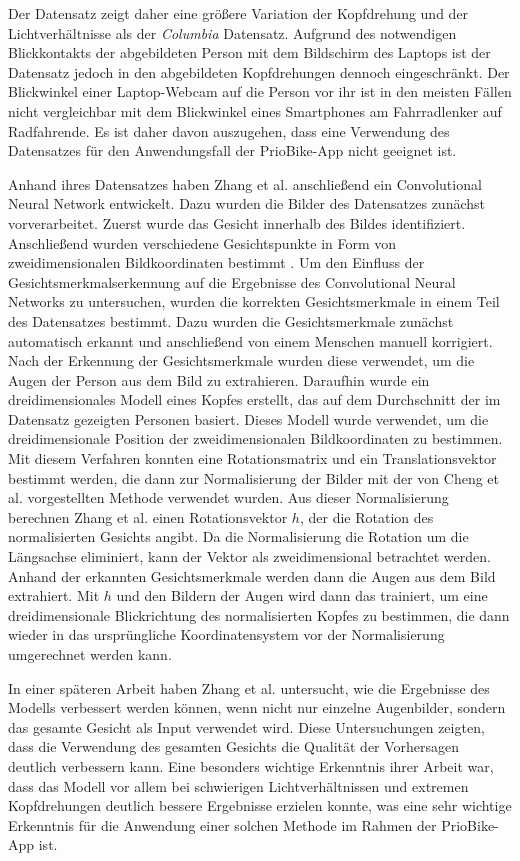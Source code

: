 Der Datensatz zeigt daher eine größere Variation der Kopfdrehung und der Lichtverhältnisse als der \textit{Columbia} \cite{paper:columbia} Datensatz. Aufgrund des notwendigen Blickkontakts der abgebildeten Person mit dem Bildschirm des Laptops ist der Datensatz jedoch in den abgebildeten Kopfdrehungen dennoch eingeschränkt. Der Blickwinkel einer Laptop-Webcam auf die Person vor ihr ist in den meisten Fällen nicht vergleichbar mit dem Blickwinkel eines Smartphones am Fahrradlenker auf Radfahrende. Es ist daher davon auszugehen, dass eine Verwendung des Datensatzes für den Anwendungsfall der PrioBike-App nicht geeignet ist.

Anhand ihres Datensatzes haben Zhang et al. \cite{paper:mpiigaze} anschließend ein Convolutional Neural Network entwickelt. Dazu wurden die Bilder des Datensatzes zunächst vorverarbeitet. Zuerst wurde das Gesicht innerhalb des Bildes identifiziert. Anschließend wurden verschiedene Gesichtspunkte in Form von zweidimensionalen Bildkoordinaten bestimmt \cite{paper:dlib}. Um den Einfluss der Gesichtsmerkmalserkennung auf die Ergebnisse des Convolutional Neural Networks zu untersuchen, wurden die korrekten Gesichtsmerkmale in einem Teil des Datensatzes bestimmt. Dazu wurden die Gesichtsmerkmale zunächst automatisch erkannt und anschließend von einem Menschen manuell korrigiert. Nach der Erkennung der Gesichtsmerkmale wurden diese verwendet, um die Augen der Person aus dem Bild zu extrahieren. Daraufhin wurde ein dreidimensionales Modell eines Kopfes erstellt, das auf dem Durchschnitt der im Datensatz gezeigten Personen basiert. Dieses Modell wurde verwendet, um die dreidimensionale Position der zweidimensionalen Bildkoordinaten \cite{paper:epnp} zu bestimmen. Mit diesem Verfahren konnten eine Rotationsmatrix und ein Translationsvektor bestimmt werden, die dann zur Normalisierung der Bilder mit der von Cheng et al. \cite{paper:basics:survey} vorgestellten Methode verwendet wurden. Aus dieser Normalisierung berechnen Zhang et al. einen Rotationsvektor $h$, der die Rotation des normalisierten Gesichts angibt. Da die Normalisierung die Rotation um die Längsachse eliminiert, kann der Vektor als zweidimensional betrachtet werden. Anhand der erkannten Gesichtsmerkmale werden dann die Augen aus dem Bild extrahiert. Mit $h$ und den Bildern der Augen wird dann das \cnn trainiert, um eine dreidimensionale Blickrichtung des normalisierten Kopfes zu bestimmen, die dann wieder in das ursprüngliche Koordinatensystem vor der Normalisierung umgerechnet werden kann.

In einer späteren Arbeit \cite{paper:mpiifacegaze} haben Zhang et al. untersucht, wie die Ergebnisse des Modells verbessert werden können, wenn nicht nur einzelne Augenbilder, sondern das gesamte Gesicht als Input verwendet wird. Diese Untersuchungen zeigten, dass die Verwendung des gesamten Gesichts die Qualität der Vorhersagen deutlich verbessern kann. Eine besonders wichtige Erkenntnis ihrer Arbeit war, dass das Modell vor allem bei schwierigen Lichtverhältnissen und extremen Kopfdrehungen deutlich bessere Ergebnisse erzielen konnte, was eine sehr wichtige Erkenntnis für die Anwendung einer solchen Methode im Rahmen der PrioBike-App ist.

